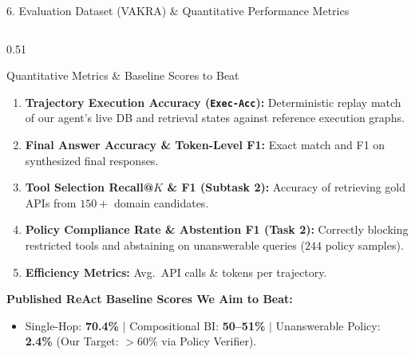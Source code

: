 \documentclass[aspectratio=169, 10pt]{beamer}
\begin{document}
\begin{frame}{6. Evaluation Dataset (VAKRA) \& Quantitative Performance Metrics}
\begin{columns}[T, onlytextwidth]
\begin{column}{0.51\textwidth}
\begin{alertblock}{Quantitative Metrics \& Baseline Scores to Beat}
\footnotesize
\begin{enumerate}
    \item \textbf{Trajectory Execution Accuracy (\texttt{Exec-Acc}):}
    Deterministic replay match of our agent's live DB and retrieval states against reference execution graphs.
    \item \textbf{Final Answer Accuracy \& Token-Level F1:}
    Exact match and F1 on synthesized final responses.
    \item \textbf{Tool Selection Recall@$K$ \& F1 (Subtask 2):}
    Accuracy of retrieving gold APIs from $150+$ domain candidates.
    \item \textbf{Policy Compliance Rate \& Abstention F1 (Task 2):}
    Correctly blocking restricted tools and abstaining on unanswerable queries ($244$ policy samples).
    \item \textbf{Efficiency Metrics:} Avg.\ API calls \& tokens per trajectory.
\end{enumerate}
\vspace{0.05cm}
\textbf{Published ReAct Baseline Scores We Aim to Beat:}
\begin{itemize}
    \scriptsize
    \item Single-Hop: \textbf{70.4\%} $|$ Compositional BI: \textbf{50--51\%} $|$ Unanswerable Policy: \textbf{2.4\%} (Our Target: $>60\%$ via Policy Verifier).
\end{itemize}
\end{alertblock}
\end{column}
\end{columns}
\end{frame}
\end{document}

